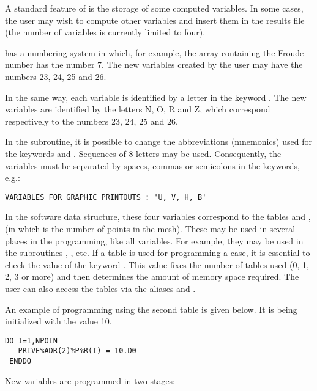 A standard feature of  is the storage of some computed variables.
In some cases, the user may wish to compute other variables and insert them
in the results file (the number of variables is currently limited to four).

 has a numbering system in which, for example,
the array containing the Froude number has the number 7.
The new variables created by the user may have the numbers 23, 24, 25 and 26.

In the same way, each variable is identified by a letter
in the keyword .
The new variables are identified by the letters N, O, R and Z,
which correspond respectively to the numbers 23, 24, 25 and 26.

In the  subroutine, it is possible
to change the abbreviations (mnemonics) used for the keywords
 and
.
Sequences of 8 letters may be used.
Consequently, the variables must be separated by spaces, commas or
semicolons in the keywords, e.g.:

\begin{lstlisting}[language=TelemacCas]
VARIABLES FOR GRAPHIC PRINTOUTS : 'U, V, H, B'
\end{lstlisting}

In the software data structure, these four variables correspond to the tables
and ,  (in which 
is the number of points in the mesh).
These may be used in several places in the programming, like all \tel variables.
For example, they may be used in the subroutines ,
,  etc.
If a  table is used for programming a case, it is essential
to check the value of the keyword .
This value fixes the number of tables used (0, 1, 2, 3 or more) and then determines
 the amount of memory space required.
The user can also access the tables via the aliases
 and .

An example of programming using the second  table is given below.
It is being initialized with the value 10.
\begin{lstlisting}[language=TelFortran]
 DO I=1,NPOIN
   PRIVE%ADR(2)%P%R(I) = 10.D0
 ENDDO
\end{lstlisting}
New variables are programmed in two stages:

